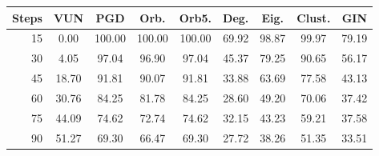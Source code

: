 \begin{tabular}{rcccccccc}
\toprule
\textbf{Steps} & \textbf{VUN} & \textbf{PGD} & \textbf{Orb.} & \textbf{Orb5.} & \textbf{Deg.} & \textbf{Eig.} & \textbf{Clust.} & \textbf{GIN} \\
\midrule
15 & 0.00 & 100.00 & 100.00 & 100.00 & 69.92 & 98.87 & 99.97 & 79.19 \\
30 & 4.05 & 97.04 & 96.90 & 97.04 & 45.37 & 79.25 & 90.65 & 56.17 \\
45 & 18.70 & 91.81 & 90.07 & 91.81 & 33.88 & 63.69 & 77.58 & 43.13 \\
60 & 30.76 & 84.25 & 81.78 & 84.25 & 28.60 & 49.20 & 70.06 & 37.42 \\
75 & 44.09 & 74.62 & 72.74 & 74.62 & 32.15 & 43.23 & 59.21 & 37.58 \\
90 & 51.27 & 69.30 & 66.47 & 69.30 & 27.72 & 38.26 & 51.35 & 33.51 \\
\bottomrule
\end{tabular}